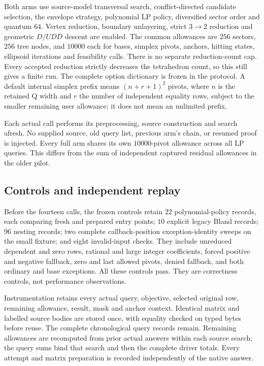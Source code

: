 Both arms use source-model transversal search, conflict-directed candidate
selection, the envelope strategy, polynomial LP policy, diversified sector
order and quantum $64$.  Vertex reduction, boundary unlayering, strict
$3\to2$ reduction and geometric $D/UDD$ descent are enabled.  The common
allowances are $256$ sectors, $256$ tree nodes, and $10000$ each for bases,
simplex pivots, anchors, hitting states, ellipsoid iterations and feasibility
calls.  There is no separate reduction-count cap.  Every accepted reduction
strictly decreases the tetrahedron count, so this still gives a finite run.
The complete option dictionary is frozen in the protocol.  A default internal
simplex prefix means $(n+r+1)^2$ pivots, where $n$ is the retained Q width
and $r$ the number of independent equality rows, subject to the smaller remaining
user allowance; it does not mean an unlimited prefix.

Each actual  call performs its preprocessing,
source construction and search afresh.  No supplied source, old query list,
previous arm's chain, or resumed proof is injected.  Every full arm shares
its own $10000$-pivot allowance across all LP queries.  This differs from
the sum of independent captured residual allowances in the older pilot.

\subsection{Controls and independent replay}

Before the fourteen calls, the frozen controls retain $22$ polynomial-policy
records, each comparing fresh and prepared entry points; $10$ explicit
legacy Bland records; $96$ nesting records; two complete callback-position
exception-identity sweeps on the small fixture; and eight invalid-input
checks.  They include unreduced dependent and zero rows, rational and large
integer coefficients, forced positive and negative fallback, zero and last
allowed pivots, denied fallback, and both ordinary and base exceptions.
All these controls pass.  They are correctness controls, not performance
observations.

Instrumentation retains every actual query, objective, selected original
row, remaining allowance, result, mask and anchor context.  Identical matrix
and labelled source bodies are stored once, with equality checked on typed
bytes before reuse.  The complete chronological query records remain.
Remaining allowances are recomputed from prior actual answers within each
source search; the query sums bind that search and then the complete driver
totals.  Every attempt and matrix preparation is recorded independently of
the native answer.


